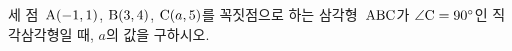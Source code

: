세 점~$\mathrm{A}(-1{,}\mkern3mu\mathopen{}1)$, $\mathrm{B}(3{,}\mkern3mu\mathopen{}4)$, $\mathrm{C}(a{,}\mkern3mu\mathopen{}5)$를 꼭짓점으로 하는 삼각형~$\mathrm{ABC}$가 $\angle\mathrm{C}=90^\circ$인 직각삼각형일 때, $a$의 값을 구하시오.
